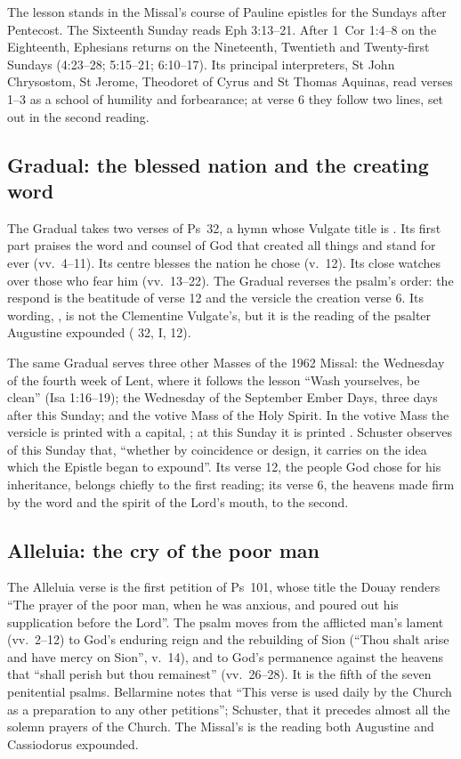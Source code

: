 The lesson stands in the Missal's course of Pauline epistles for the Sundays
after Pentecost. The Sixteenth Sunday reads Eph 3:13--21. After 1~Cor 1:4--8
on the Eighteenth, Ephesians returns on the Nineteenth, Twentieth and
Twenty-first Sundays (4:23--28; 5:15--21; 6:10--17). Its principal
interpreters, St John Chrysostom, St Jerome, Theodoret of Cyrus and St Thomas
Aquinas, read verses 1--3 as a school of humility and forbearance; at verse 6
they follow two lines, set out in the second reading.

\subsection{Gradual: the blessed nation and the creating word}

The Gradual takes two verses of Ps~32, a hymn whose Vulgate title is
. Its first part praises the word and counsel of God that
created all things and stand for ever (vv.~4--11). Its centre blesses the
nation he chose (v.~12). Its close watches over those who fear him
(vv.~13--22). The Gradual reverses the psalm's order: the respond is the
beatitude of verse 12 and the versicle the creation verse 6. Its wording,
, is not the Clementine
Vulgate's, but it is the reading of the psalter Augustine expounded
( 32, I, 12).

The same Gradual serves three other Masses of the 1962 Missal: the Wednesday
of the fourth week of Lent, where it follows the lesson ``Wash yourselves, be
clean'' (Isa 1:16--19); the Wednesday of the September Ember Days, three days
after this Sunday; and the votive Mass of the Holy Spirit. In the votive Mass
the versicle is printed with a capital, ; at this
Sunday it is printed . Schuster observes of this Sunday that, ``whether by coincidence or
design, it carries on the idea which the Epistle began to expound''. Its verse 12, the people God chose for his inheritance, belongs chiefly to
the first reading; its verse 6, the heavens made firm by the word and the
spirit of the Lord's mouth, to the second.

\subsection{Alleluia: the cry of the poor man}

The Alleluia verse is the first petition of Ps~101, whose title the Douay
renders ``The prayer of the poor man, when he was anxious, and poured out his
supplication before the Lord''. The psalm moves from the afflicted man's
lament (vv.~2--12) to God's enduring reign and the rebuilding of Sion (``Thou
shalt arise and have mercy on Sion'', v.~14), and to God's permanence against
the heavens that ``shall perish but thou remainest'' (vv.~26--28). It is the fifth of the seven penitential
psalms. Bellarmine notes that ``This verse is used daily by the Church as a
preparation to any other petitions''; Schuster, that it precedes almost all the
solemn prayers of the Church. The Missal's  is the reading
both Augustine and Cassiodorus expounded.

